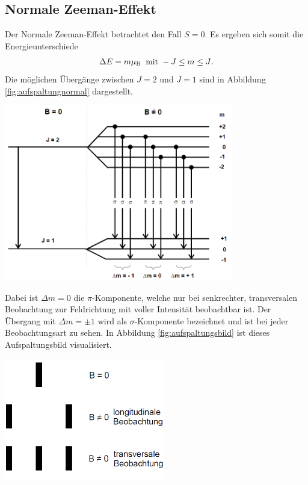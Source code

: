 \documentclass[captions=tableheading]{scrartcl}
\newcommand{\indx}[1]{\text{#1}}
\begin{document}
\subsection{Normale Zeeman-Effekt}
Der Normale Zeeman-Effekt betrachtet den Fall $S=0$. 
Es ergeben sich somit die Energieunterschiede
\begin{align}
\Delta E=m\mu_\indx{B}\hspace{0.2cm}\text{mit }-J\le m \le J \text{.}
\end{align}
Die möglichen Übergänge zwischen $J=2$ und $J=1$ sind in Abbildung \ref{fig:aufspaltungnormal} dargestellt.
\begin{center}
	\includegraphics[width=10cm]{images/aufspaltungnormal.png}
	\label{fig:aufspaltungnormal}
\end{center}
Dabei ist $\Delta m=0$ die $\pi$-Komponente, welche nur bei senkrechter, transversalen Beobachtung zur Feldrichtung mit voller Intensität beobachtbar ist. 
Der Übergang mit $\Delta m=\pm 1$ wird als $\sigma$-Komponente bezeichnet und ist bei jeder Beobachtungsart zu sehen. 
In Abbildung \ref{fig:aufspaltungsbild} ist dieses Aufspaltungsbild visualisiert.
\begin{center}
	\includegraphics[width=7cm]{images/aufspaltungsbild.png}
	\label{fig:aufspaltungsbild}
\end{center}
\end{document}
